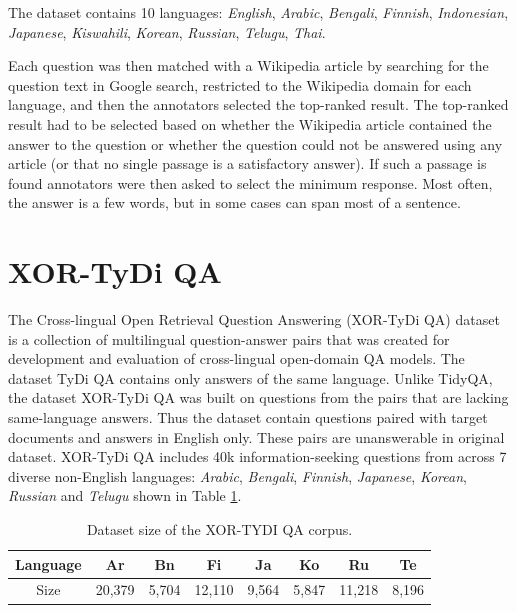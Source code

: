 The dataset contains 10 languages: \emph{English}, \emph{Arabic}, \emph{Bengali}, \emph{Finnish}, \emph{Indonesian}, \emph{Japanese}, \emph{Kiswahili}, \emph{Korean}, \emph{Russian}, \emph{Telugu}, \emph{Thai}.

Each question was then matched with a Wikipedia article by searching for the question text in Google search, restricted to the Wikipedia domain for each language, and then the annotators selected the top-ranked result. The top-ranked result had to be selected based on whether the Wikipedia article contained the answer to the question or whether the question could not be answered using any article (or that no single passage is a satisfactory answer). If such a passage is found annotators were then asked to select the minimum response. Most often, the answer is a few words, but in some cases can span most of a sentence.



\section{XOR-TyDi QA}
The Cross-lingual Open Retrieval Question Answering (XOR-TyDi QA) dataset~\cite{xortydiqa} is a collection of multilingual question-answer pairs that was created for development and evaluation of cross-lingual open-domain QA models. The dataset TyDi QA contains only answers of the same language. Unlike TidyQA, the dataset XOR-TyDi QA was built on questions from the pairs that are lacking same-language answers. Thus the dataset contain questions paired with target documents and answers in English only. These pairs are unanswerable in original dataset. XOR-TyDi QA includes 40k information-seeking questions from across 7 diverse non-English languages: \emph{Arabic}, \emph{Bengali}, \emph{Finnish}, \emph{Japanese}, \emph{Korean}, \emph{Russian} and \emph{Telugu} shown in Table \ref{tab:size}.

\begin{table}[ht]
    \centering
    \begin{tabular}{c|ccccccc}
        Language & Ar & Bn & Fi & Ja & Ko & Ru & Te \\
        \hline
        Size & 20,379 & 5,704 & 12,110 & 9,564 & 5,847 & 11,218 & 8,196
    \end{tabular}
    \caption{Dataset size of the XOR-TYDI QA corpus.}
    \label{tab:size}
\end{table}

